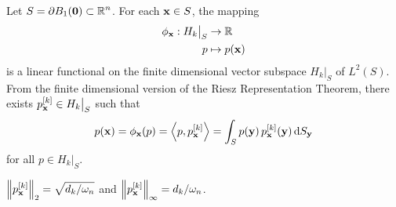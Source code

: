 Let $\displaystyle S = \partial B_1(\mathbf{0}) \subset \mathbb{R}^n$.
For each $\mathbf{x} \in S$, the mapping
\begin{align*}
  \phi_{\mathbf{x}}: H_k\big|_S &\to \mathbb{R} \\
  p &\mapsto p(\mathbf{x})
\end{align*}
is a linear functional on the finite dimensional vector subspace
$\displaystyle H_k\big|_S$ of $L^2(S)$.  From the finite dimensional
version of the Riesz Representation Theorem, there exists
$\displaystyle p_{\mathbf{x}}^{[k]}\in H_k\big|_S$ such that 
\[
  p(\mathbf{x}) = \phi_{\mathbf{x}}(p) = \left\langle{p} , {p_{\mathbf{x}}^{[k]}}\right\rangle
  = \int_S p(\mathbf{y})\,p_{\mathbf{x}}^{[k]}(\mathbf{y}) \,\mathrm{d}{S}_{\mathbf{y}}
\]
for all $\displaystyle p \in H_k\big|_S$.

\begin{prop} \label{L2NormPx}
$\displaystyle \left\| p_{\mathbf{x}}^{[k]} \right\|_2 = \sqrt{d_k/\omega_n}$ and
$\displaystyle \left\| p_{\mathbf{x}}^{[k]} \right\|_\infty = d_k/\omega_n$.  
\end{prop}

